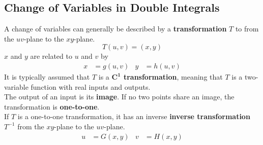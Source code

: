 \documentclass[../Calculus \Roman{3}.tex]{subfiles}
\begin{document}
			\subsection*{Change of Variables in Double Integrals}
				A change of variables can generally be described by a \textbf{transformation} $T$ to from the $uv$-plane to the $xy$-plane.
					\[T(u, v) = (x, y)\]
					$x$ and $y$ are related to $u$ and $v$ by
					\begin{align*}
						x &= g(u, v) &
								y &= h(u, v)
					\end{align*}
				It is typically assumed that $T$ is a \textbf{$\bm{C^1}$ transformation}, meaning that $T$ is a two-variable function with real inputs and outputs. \\
				The output of an input is its \textbf{image}. If no two points share an image, the transformation is \textbf{one-to-one}. \\
				If $T$ is a one-to-one transformation, it has an inverse \textbf{inverse transformation} $T^{-1}$ from the $xy$-plane to the $uv$-plane.
					\begin{align*}
						u &= G(x, y) &
								v &= H(x, y)
					\end{align*}
\end{document}
